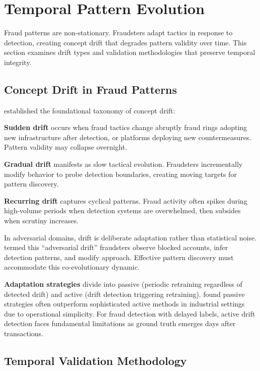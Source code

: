 \section{Temporal Pattern Evolution}
\label{sec:2_6}

Fraud patterns are non-stationary. Fraudsters adapt tactics in response to detection, creating concept drift that degrades pattern validity over time. This section examines drift types and validation methodologies that preserve temporal integrity.

\subsection{Concept Drift in Fraud Patterns}

\citeauthor{gama2014survey} \cite{gama2014survey} established the foundational taxonomy of concept drift:

\textbf{Sudden drift} occurs when fraud tactics change abruptly fraud rings adopting new infrastructure after detection, or platforms deploying new countermeasures. Pattern validity may collapse overnight.

\textbf{Gradual drift} manifests as slow tactical evolution. Fraudsters incrementally modify behavior to probe detection boundaries, creating moving targets for pattern discovery.

\textbf{Recurring drift} captures cyclical patterns. Fraud activity often spikes during high-volume periods when detection systems are overwhelmed, then subsides when scrutiny increases.

In adversarial domains, drift is deliberate adaptation rather than statistical noise. \citeauthor{dalpozzolo2017credit} \cite{dalpozzolo2017credit} termed this ``adversarial drift'' fraudsters observe blocked accounts, infer detection patterns, and modify approach. Effective pattern discovery must accommodate this co-evolutionary dynamic.

\textbf{Adaptation strategies} divide into passive (periodic retraining regardless of detected drift) and active (drift detection triggering retraining). \citeauthor{krawczyk2017ensemble} \cite{krawczyk2017ensemble} found passive strategies often outperform sophisticated active methods in industrial settings due to operational simplicity. For fraud detection with delayed labels, active drift detection faces fundamental limitations as ground truth emerges days after transactions.

\subsection{Temporal Validation Methodology}

